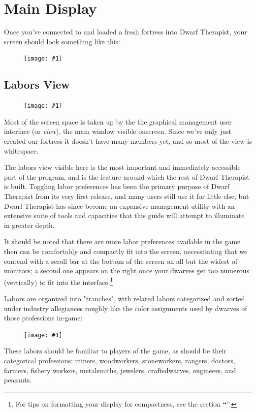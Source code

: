 \documentclass[]{article}
\newcommand{\jump}[1] {\textbf{``\nameref{sec:#1}}''}
\newcommand{\fullfigure}[1] {
\begin{figure}[h!]
\texttt{[image: \#1]}
\end{figure}
}
\begin{document}
\section{Main Display}
\label{sec:Main Display}
Once you've connected to and loaded a fresh fortress into Dwarf Therapist, your screen should look
something like this:

\fullfigure{Sec1Fig4}

\subsection{Labors View}
\label{sec:Labors View}
\fullfigure{Sec1Fig5}

Most of the screen space is taken up by the the graphical management user interface
(or \emph{view}), the main window visible onscreen. Since we've only just created our fortress it doesn't
have many members yet, and so most of the view is whitespace.

The labors view visible here is the most important and immediately accessible part of the program,
and is the feature around which the rest of Dwarf Therapist is built. Toggling labor preferences has
been the primary purpose of Dwarf Therapist from its very first release, and many users still use it for
little else; but Dwarf Therapist has since become an expansive management utility with an
extensive suite of tools and capacities that this guide will attempt to illuminate in greater depth.

It should be noted that there are more labor preferences available in the game
then can be comfortably and compactly fit into the screen, necessitating that we contend with a scroll
bar at the bottom of the screen on all but the widest of monitors; a second one appears on the right once
your dwarves get too numerous (vertically) to fit into the interface.\footnote{For tips on
formatting your display for compactness, see the section \jump{Formatting Your Display}.}

Labors are organized into "tranches", with related labors categorized and sorted under industry
allegiances roughly like the color assignments used by dwarves of those professions in-game:
\fullfigure{Sec1Fig6+}

These labors should be familiar to players of the game, as should be their categorical
professions: miners, woodworkers, stoneworkers, rangers, doctors, farmers, fishery workers, metalsmiths,
jewelers, craftsdwarves, engineers, and peasants.
\end{document}
